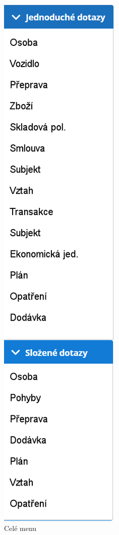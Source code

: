 \documentclass[thesis=M,czech]{FITthesis}[2019/12/23]
\begin{document}
\begin{figure}[H]
  \centering
  \includegraphics[scale=0.5]{res/guide/MenuFull.png}
  \caption{Celé menu}
  \label{fig:Celé menu}
\end{figure}
\end{document}
